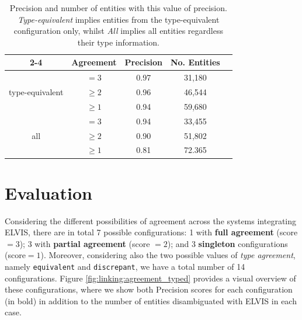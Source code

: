 \begin{table}[ht!]
\centering
\def\arraystretch{1.2}
	\begin{tabular}{| c | c | c | c | c |}
\cline{2-4}
\multicolumn{1}{ c |  }{} & \textbf{Agreement} & \textbf{Precision} & \textbf{No. Entities} \\
\hline
\multirow{3}{*}{type-equivalent} & $=3$ & 0.97 & 31,180\\
&$\geq2$ & 0.96 & 46,544 \\
&$\geq1$ & 0.94 & 59,680 \\
\hline
\multirow{3}{*}{all} & $=3$ & 0.94 & 33,455\\
&$\geq2$ & 0.90 & 51,802\\
&$\geq1$ & 0.81 & 72.365\\
\hline
	\end{tabular}
	\caption{Precision and number of entities with this value of precision. \textit{Type-equivalent} implies entities from the type-equivalent configuration only, whilst \textit{All} implies all entities regardless their type information.}
	\label{tbl:linking:results}
\end{table}

\section{Evaluation}
\label{sec:linking:eval}

Considering the different possibilities of agreement across the systems integrating \textsc{ELVIS}, there are in total 7 possible configurations: 1 with \textbf{full agreement} (score$=3$); 3 with \textbf{partial agreement} (score $=2$); and 3 \textbf{singleton} configurations (score$=1$). Moreover, considering also the two possible values of \textit{type agreement}, namely \texttt{equivalent} and \texttt{discrepant}, we have a total number of 14 configurations. Figure \ref{fig:linking:agreement_typed} provides a visual overview of these configurations, where we show both Precision scores for each configuration (in bold) in addition to the number of entities disambiguated with \textsc{ELVIS} in each case.



